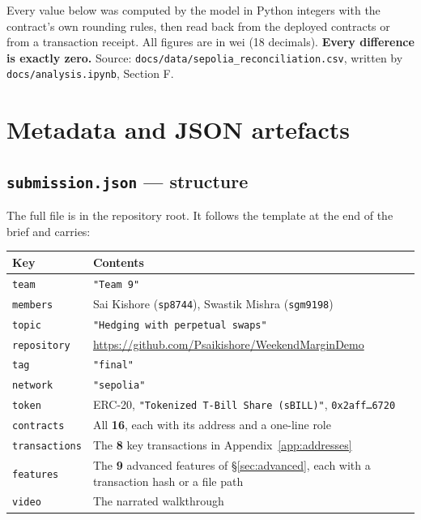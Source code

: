 \documentclass[11pt,a4paper]{article}
\begin{document}
Every value below was computed by the model in Python integers with the contract's own rounding
rules, then read back from the deployed contracts or from a transaction receipt. All figures are in
wei (18 decimals). \textbf{Every difference is exactly zero.} Source:
\nolinkurl{docs/data/sepolia_reconciliation.csv}, written by \texttt{docs/analysis.ipynb}, Section F.



\section{Metadata and JSON artefacts}\label{app:json}

\subsection{\texttt{submission.json} --- structure}

The full file is in the repository root. It follows the template at the end of the brief and carries:

\begin{center}
\small
\begin{tabular}{@{}p{3.4cm}p{11.8cm}@{}}
\toprule
\textbf{Key} & \textbf{Contents} \\
\midrule
\texttt{team} & \texttt{"Team 9"} \\
\texttt{members} & Sai Kishore (\texttt{sp8744}), Swastik Mishra (\texttt{sgm9198}) \\
\texttt{topic} & \texttt{"Hedging with perpetual swaps"} \\
\texttt{repository} & \url{https://github.com/Psaikishore/WeekendMarginDemo} \\
\texttt{tag} & \texttt{"final"} \\
\texttt{network} & \texttt{"sepolia"} \\
\texttt{token} & ERC-20, \texttt{"Tokenized T-Bill Share (sBILL)"}, \texttt{0x2aff\ldots6720} \\
\texttt{contracts} & All \textbf{16}, each with its address and a one-line role \\
\texttt{transactions} & The \textbf{8} key transactions in Appendix~\ref{app:addresses} \\
\texttt{features} & The \textbf{9} advanced features of \S\ref{sec:advanced}, each with a transaction hash or a file path \\
\texttt{video} & The narrated walkthrough \\
\bottomrule
\end{tabular}
\end{center}
\end{document}
